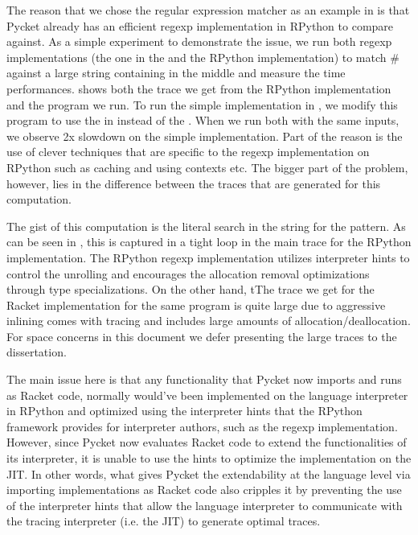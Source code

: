 The reason that we chose the regular expression matcher as an example
in  is that Pycket already has an efficient regexp
implementation in RPython to compare against. As a simple experiment
to demonstrate the issue, we run both regexp implementations (the one
in the  and the RPython implementation) to match
$\mathtt{\#}$ against a large string containing
 in the middle and measure the time
performances.  shows both the trace we get
from the RPython implementation and the program we run. To run the
simple implementation in , we modify this program
to use the  in instead of the
. When we run both with the same inputs, we
observe 2x slowdown on the simple implementation. Part of the reason
is the use of clever techniques that are specific to the regexp
implementation on RPython such as caching and using contexts etc. The
bigger part of the problem, however, lies in the difference between
the traces that are generated for this computation.

The gist of this computation is the literal search in the string for
the  pattern. As can be seen in
, this is captured in a tight loop in the
main trace for the RPython implementation. The RPython regexp
implementation utilizes interpreter hints to control the unrolling and
encourages the allocation removal optimizations through type
specializations. On the other hand, tThe trace we get for the Racket
implementation for the same program is quite large due to aggressive
inlining comes with tracing and includes large amounts of
allocation/deallocation. For space concerns in this document we defer
presenting the large traces to the dissertation.

The main issue here is that any functionality that Pycket now imports
and runs as Racket code, normally would've been implemented on the
language interpreter in RPython and optimized using the interpreter
hints that the RPython framework provides for interpreter authors,
such as the regexp implementation. However, since Pycket now evaluates
Racket code to extend the functionalities of its interpreter, it is
unable to use the hints to optimize the implementation on the JIT. In
other words, what gives Pycket the extendability at the language level
via importing implementations as Racket code also cripples it by
preventing the use of the interpreter hints that allow the language
interpreter to communicate with the tracing interpreter (i.e. the JIT)
to generate optimal traces.

